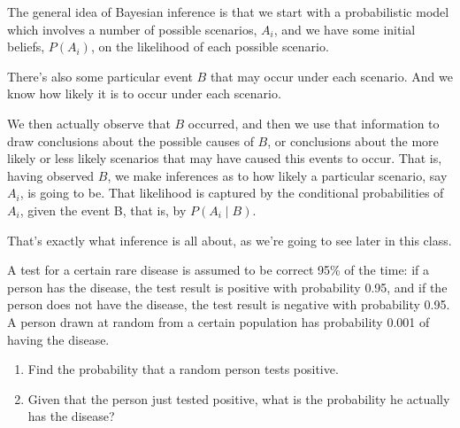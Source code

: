 \documentclass{tufte-handout}
\begin{document}
The
general idea of Bayesian inference is that we start with a probabilistic model which involves a number of possible scenarios, $A_i$,
and we have some initial beliefs, $P(A_i)$, on the likelihood of each possible scenario. 

There's also some particular event $B$ that may occur under each scenario. And we know how likely it is to
occur under each scenario. 

We then actually observe that $B$ occurred, and then we use that
information to draw conclusions about the possible causes of $B$, or conclusions about the more likely or
less likely scenarios that may have caused this events to occur. That is, having observed $B$, we make inferences as to 
how likely a particular scenario, say $A_i$, is going to be. That likelihood is captured by the conditional probabilities of $A_i$, 
given the event B, that is, by $P(A_i \mid B)$. 


That's exactly what inference is all about, as we're going to see later in this class.


 A test for a certain rare disease is assumed to be correct 95\% 
of the time: if a person has the disease, the test result is positive with probability 0.95, and if the person does not 
have the disease, the test result is negative with probability 0.95. A person drawn at random from a certain population 
has probability 0.001 of having the disease.

\begin{enumerate}
\item Find the probability that a random person tests positive.
\item Given that the person just tested positive, what is the probability he actually has the disease?
\end{enumerate}
\end{document}
